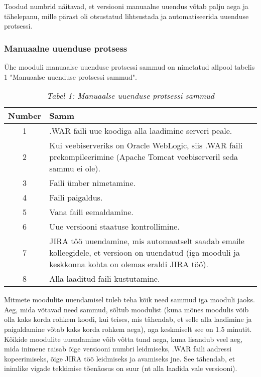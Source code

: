 \documentclass[12pt]{report}
\begin{document}
  Toodud numbrid näitavad, et versiooni manuaalne uuendus võtab palju aega ja tähelepanu, mille pärast oli otsustatud lihtsustada ja automatiseerida uuenduse protsessi.
  
  \newpage
  \subsubsection{Manuaalne uuenduse protsess}
  
  Ühe mooduli manuaalse uuenduse protsessi sammud on nimetatud allpool tabelis 1 "Manuaalse uuenduse protsessi sammud".
  
  \begin{table}[!htbp] 
  \begin{tabular}{ |c|p{11cm}| }
    \hline
    \textbf{Number} & \textbf{Samm}\\
    \hline
    1 & .WAR faili uue koodiga alla laadimine serveri peale.\\
    \hline
    2 & Kui veebiserveriks on Oracle WebLogic, siis .WAR faili prekompileerimine (Apache Tomcat veebiserveril seda sammu ei ole).\\
    \hline
    3 & Faili ümber nimetamine.\\
    \hline
    4 & Faili paigaldus.\\
    \hline
    5 & Vana faili eemaldamine.\\
    \hline
    6 & Uue versiooni staatuse kontrollimine.\\
    \hline
    7 & JIRA töö uuendamine, mis automaatselt saadab emaile kolleegidele, et versioon on uuendatud (iga mooduli ja keskkonna kohta on olemas eraldi JIRA töö).\\
    \hline
    8 & Alla laaditud faili kustutamine.\\
    \hline
  \end{tabular}
  \caption*{\textit{Tabel 1: Manuaalse uuenduse protsessi sammud}}
  \end{table}
  
  Mitmete moodulite uuendamisel tuleb teha kõik need sammud iga mooduli jaoks. Aeg, mida võtavad need sammud, sõltub moodulist (kuna mõnes moodulis võib olla kaks korda rohkem koodi, kui teises, mis tähendab, et selle alla laadimine ja paigaldamine võtab kaks korda rohkem aega), aga keskmiselt see on 1.5 minutit. Kõikide moodulite uuendamine võib võtta tund aega, kuna lisandub veel aeg, mida inimene raisab õige versiooni numbri leidmiseks, .WAR faili aadressi kopeerimiseks, õige JIRA töö leidmiseks ja avamiseks jne. See tähendab, et inimlike vigade tekkimise tõenäosus on suur (nt alla laadida vale versiooni).\\
  
\end{document}
